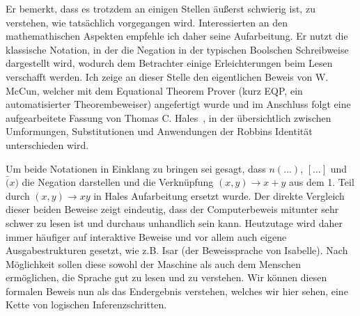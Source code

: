 Er bemerkt, dass es trotzdem an einigen Stellen äußerst schwierig ist, zu verstehen, wie tatsächlich vorgegangen wird.
Interessierten an den mathemathischen Aspekten empfehle ich daher seine Aufarbeitung.
Er nutzt die klassische Notation, in der die Negation in der typischen Boolschen Schreibweise dargestellt wird, wodurch dem Betrachter einige Erleichterungen beim Lesen verschafft werden.
Ich zeige an dieser Stelle den eigentlichen Beweis von W. McCun, welcher mit dem Equational Theorem Prover (kurz EQP, ein automatisierter Theorembeweiser) angefertigt wurde und im Anschluss folgt eine aufgearbeitete Fassung von Thomas C. Hales~\cite{hales_formalproof}, in der übersichtlich zwischen Umformungen, Substitutionen und Anwendungen der Robbins Identität unterschieden wird.

Um beide Notationen in Einklang zu bringen sei gesagt, dass   $n(\ldots)$, $[\dots]$ und $\bar(x)$ die Negation darstellen und die Verknüpfung $(x,y) \rightarrow x + y$ aus dem 1. Teil durch $(x,y) \rightarrow xy$ in Hales Aufarbeitung ersetzt wurde.
Der direkte Vergleich dieser beiden Beweise zeigt eindeutig, dass der
Computerbeweis mitunter sehr schwer zu lesen ist und durchaus unhandlich sein
kann. Heutzutage wird daher immer häufiger auf interaktive Beweise und vor allem
auch eigene Ausgabestrukturen gesetzt, wie z.B. Isar (der Beweissprache von
Isabelle). Nach Möglichkeit sollen diese sowohl der Maschine als auch dem Menschen
ermöglichen, die Sprache gut zu lesen und zu verstehen.
Wir können diesen formalen Beweis nun als das Endergebnis verstehen, welches wir hier sehen, eine Kette von logischen Inferenzschritten.

